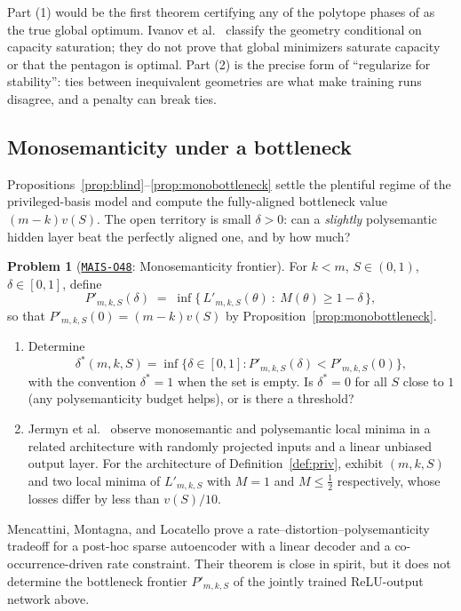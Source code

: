 \documentclass[11pt]{amsart}
\newcommand{\Oid}[1]{\href{https://github.com/lionellevine/MAIS/blob/main/open-problems/MAIS-O#1.md}{\texttt{MAIS-O#1}}}
\theoremstyle{plain}
\theoremstyle{definition}
\newtheorem{problem}[theorem]{Problem}
\begin{document}
Part (1) would be the first theorem certifying any of the polytope phases of \cite{elhage2022} as the true global optimum. Ivanov et al.~\cite{ivanov2026} classify the geometry conditional on capacity saturation; they do not prove that global minimizers saturate capacity or that the pentagon is optimal. Part (2) is the precise form of ``regularize for stability'': ties between inequivalent geometries are what make training runs disagree, and a penalty can break ties.

\subsection{Monosemanticity under a bottleneck}

Propositions~\ref{prop:blind}--\ref{prop:monobottleneck} settle the plentiful regime of the privileged-basis model and compute the fully-aligned bottleneck value $(m-k)v(S)$. The open territory is small $\delta>0$: can a \emph{slightly} polysemantic hidden layer beat the perfectly aligned one, and by how much?

\begin{problem}[\Oid{48}: Monosemanticity frontier]\label{prob:mono}
For $k<m$, $S\in(0,1)$, $\delta\in[0,1]$, define
\[
P'_{m,k,S}(\delta) \;=\; \inf\bigl\{\,L'_{m,k,S}(\theta)\ :\ M(\theta)\ge 1-\delta\,\bigr\},
\]
so that $P'_{m,k,S}(0)=(m-k)v(S)$ by Proposition~\ref{prop:monobottleneck}.
\begin{enumerate}
\item Determine
\[
\delta^*(m,k,S)=\inf\{\delta\in[0,1] : P'_{m,k,S}(\delta)<P'_{m,k,S}(0)\},
\]
with the convention $\delta^*=1$ when the set is empty. Is $\delta^*=0$ for all $S$ close to $1$ (any polysemanticity budget helps), or is there a threshold?
\item Jermyn et al.~\cite{jermyn2022} observe monosemantic and polysemantic local minima in a related architecture with randomly projected inputs and a linear unbiased output layer. For the architecture of Definition~\ref{def:priv}, exhibit $(m,k,S)$ and two local minima of $L'_{m,k,S}$ with $M=1$ and $M\le\tfrac12$ respectively, whose losses differ by less than $v(S)/10$.
\end{enumerate}
\end{problem}

Mencattini, Montagna, and Locatello \cite{mencattini2026} prove a rate--distortion--polysemanticity tradeoff for a post-hoc sparse autoencoder with a linear decoder and a co-occurrence-driven rate constraint. Their theorem is close in spirit, but it does not determine the bottleneck frontier $P'_{m,k,S}$ of the jointly trained ReLU-output network above.
\end{document}
